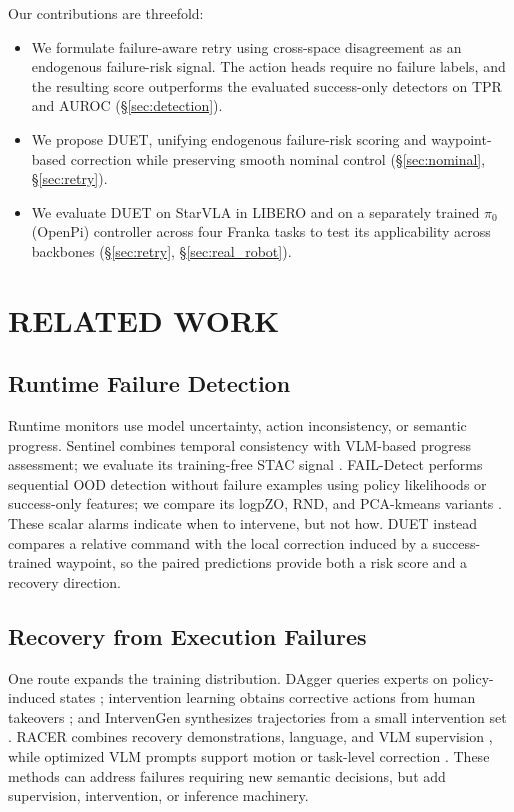 \documentclass[letterpaper, 10 pt, conference]{ieeeconf}
\begin{document}
Our contributions are threefold:
\begin{itemize}
    \item We formulate failure-aware retry using cross-space disagreement as an endogenous failure-risk signal. The action heads require no failure labels, and the resulting score outperforms the evaluated success-only detectors on TPR and AUROC (\S\ref{sec:detection}).
    \item We propose DUET, unifying endogenous failure-risk scoring and waypoint-based correction while preserving smooth nominal control (\S\ref{sec:nominal}, \S\ref{sec:retry}).
    \item We evaluate DUET on StarVLA in LIBERO and on a separately trained $\pi_0$ (OpenPi) controller across four Franka tasks to test its applicability across backbones (\S\ref{sec:retry}, \S\ref{sec:real_robot}).
\end{itemize}

\section{RELATED WORK}

\subsection{Runtime Failure Detection}
Runtime monitors use model uncertainty, action inconsistency, or semantic progress. Sentinel combines temporal consistency with VLM-based progress assessment; we evaluate its training-free STAC signal \cite{sentinel}. FAIL-Detect performs sequential OOD detection without failure examples using policy likelihoods or success-only features; we compare its logpZO, RND, and PCA-kmeans variants \cite{faildetect}. These scalar alarms indicate when to intervene, but not how. DUET instead compares a relative command with the local correction induced by a success-trained waypoint, so the paired predictions provide both a risk score and a recovery direction.

\subsection{Recovery from Execution Failures}
One route expands the training distribution. DAgger queries experts on policy-induced states \cite{dagger}; intervention learning obtains corrective actions from human takeovers \cite{eil,sirius}; and IntervenGen synthesizes trajectories from a small intervention set \cite{intervengen}. RACER combines recovery demonstrations, language, and VLM supervision \cite{racer}, while optimized VLM prompts support motion or task-level correction \cite{vlmrecovery}. These methods can address failures requiring new semantic decisions, but add supervision, intervention, or inference machinery.
\end{document}
